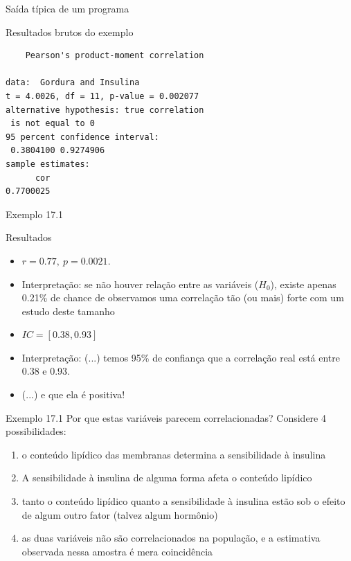\documentclass{beamer}
\begin{document}
\begin{frame}[fragile]{\scriptsize Saída típica de um programa}
  \begin{exampleblock}{Resultados brutos do exemplo}
    \scriptsize
\begin{verbatim}
	Pearson's product-moment correlation

data:  Gordura and Insulina
t = 4.0026, df = 11, p-value = 0.002077
alternative hypothesis: true correlation
 is not equal to 0
95 percent confidence interval:
 0.3804100 0.9274906
sample estimates:
      cor
0.7700025
\end{verbatim}
  \end{exampleblock}
\end{frame}

\begin{frame}{\scriptsize Exemplo 17.1}
  \begin{exampleblock}{Resultados}
    \footnotesize
    \begin{itemize}
      \footnotesize
    \item $r = 0.77,\ p=0.0021$.
    \item Interpretação: se não houver relação entre as variáveis
      ($H_0$), existe apenas 0.21\% de chance de observamos uma
      correlação tão (ou mais) forte com um estudo deste tamanho

      \bigskip
      \bigskip
    \item $IC = [0.38, 0.93]$
    \item Interpretação: (...) temos 95\% de confiança que a correlação real está entre 0.38 e 0.93.
    \item (...) e que ela é positiva!
    \end{itemize}
  \end{exampleblock}
\end{frame}

\begin{frame}{\scriptsize Exemplo 17.1}
  \scriptsize
  Por que estas variáveis parecem correlacionadas?
  Considere 4 possibilidades:
  \bigskip
  \bigskip
  \begin{enumerate}
    \footnotesize
  \item o conteúdo lipídico das membranas \alert<1>{determina} a
    sensibilidade à insulina
    \bigskip
  \item A sensibilidade à insulina de alguma forma \alert<2>{afeta} o conteúdo lipídico
    \bigskip
  \item tanto o conteúdo lipídico quanto a sensibilidade à insulina
    estão sob o efeito de \alert<3>{algum outro} fator (talvez algum hormônio)
    \bigskip
  \item as duas variáveis não são correlacionados na população, e a
    estimativa observada nessa amostra é \alert<4>{mera coincidência}
  \end{enumerate}
\end{frame}
\end{document}
